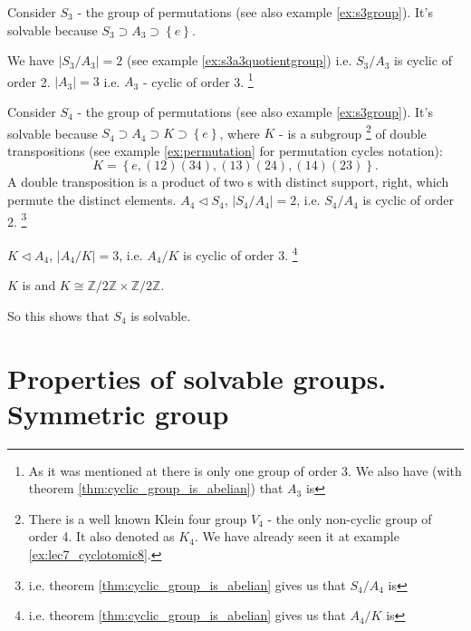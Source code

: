 \begin{example}
  Consider $S_3$ - the group of permutations (see also example
  \ref{ex:s3group}). It's solvable because 
  $S_3 \supset A_3 \supset \left\{e\right\}$.

  We have $\left|S_3/A_3\right| = 2$ (see example
  \ref{ex:s3a3quotientgroup}) i.e. $S_3/A_3$ is cyclic of order 
  2. $\left|A_3\right| = 3$ i.e. $A_3$ - cyclic of order 3.
  \footnote{
    As it was mentioned at \cite{wiki:finitegroup} there is only one
    group of order 3. We also have (with theorem
    \ref{thm:cyclic_group_is_abelian}) that $A_3$ is
  }
  \label{ex:lec8_s3}
\end{example}

\begin{example}
  Consider $S_4$ - the group of permutations (see also example
  \ref{ex:s3group}). It's solvable because 
  $S_4 \supset A_4 \supset K \supset \left\{e\right\}$, where $K$ -
  is a subgroup
  \footnote{
    There is a well known Klein four group $V_4$ \cite{wiki:klein4group} -
    the only non-cyclic group of order 4. It also denoted as $K_4$. We
    have already seen it at example \ref{ex:lec7_cyclotomic8}.
  }
  of double transpositions
  (see example
  \ref{ex:permutation} for permutation cycles notation):
  \[
  K = \left\{
  e, (12)(34), (13)(24), (14)(23)
  \right\}.
  \]
  A double transposition is a product of two s with
  distinct support, right, which permute the distinct elements.
  $A_4 \triangleleft S_4$, $\left|S_4/A_4\right| = 2$, i.e.
  $S_4/A_4$ is cyclic of order 2.
  \footnote{
    i.e. theorem
    \ref{thm:cyclic_group_is_abelian} gives us that $S_4/A_4$ is
  }

  $K \triangleleft A_4$, $\left|A_4/K\right| = 3$, i.e.
  $A_4/K$ is cyclic of order 3.
  \footnote{
    i.e. theorem
    \ref{thm:cyclic_group_is_abelian} gives us that $A_4/K$ is
  }
  
  $K$ is  and
  $K \cong \mathbb{Z}/2\mathbb{Z} \times \mathbb{Z}/2 \mathbb{Z}$.

  So this shows that $S_4$ is solvable.
  \label{ex:lec8_s4}
\end{example}

\section{Properties of solvable groups. Symmetric group}

